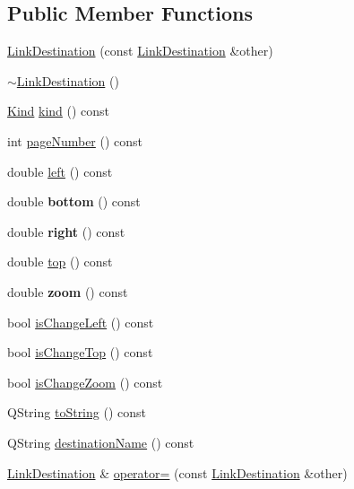 \subsection*{Public Member Functions}
\begin{DoxyCompactItemize}
\item 
\hyperlink{class_poppler_1_1_link_destination_a36d523c302358ce800ad6eb9aa9fe3d0}{Link\+Destination} (const \hyperlink{class_poppler_1_1_link_destination}{Link\+Destination} \&other)
\item 
\hyperlink{class_poppler_1_1_link_destination_ac9b5bcfe42efb41d18f862c8de479af1}{$\sim$\+Link\+Destination} ()
\item 
\hyperlink{class_poppler_1_1_link_destination_a97a2b266fbd0c48fc0189269b9941810}{Kind} \hyperlink{class_poppler_1_1_link_destination_a967d58c1f147720ae0091d0669e6684b}{kind} () const
\item 
int \hyperlink{class_poppler_1_1_link_destination_a618f5280d20902bb83e99e7894ddbafe}{page\+Number} () const
\item 
double \hyperlink{class_poppler_1_1_link_destination_a408de2b77a52aead8f1782ad464c8e3e}{left} () const
\item 
\mbox{\label{class_poppler_1_1_link_destination_a738978c2ece65331e34f4f5f5e474296}} 
double {\bfseries bottom} () const
\item 
\mbox{\label{class_poppler_1_1_link_destination_aef08f29217232da94d47cb9199350d4d}} 
double {\bfseries right} () const
\item 
double \hyperlink{class_poppler_1_1_link_destination_ab890fec31bee5e967c56b443b068f62f}{top} () const
\item 
\mbox{\label{class_poppler_1_1_link_destination_a8bce0c034ee188d2cccf7e255b90df35}} 
double {\bfseries zoom} () const
\item 
bool \hyperlink{class_poppler_1_1_link_destination_a523f8bfa4ae35647d2c00f14ca6bca5f}{is\+Change\+Left} () const
\item 
bool \hyperlink{class_poppler_1_1_link_destination_a477b631b2f1c8bb36813ff49776d331f}{is\+Change\+Top} () const
\item 
bool \hyperlink{class_poppler_1_1_link_destination_ac370c7a2833099390ee4054c02a4b84f}{is\+Change\+Zoom} () const
\item 
Q\+String \hyperlink{class_poppler_1_1_link_destination_a66d3b538d8164c3ea923416fc07a0436}{to\+String} () const
\item 
Q\+String \hyperlink{class_poppler_1_1_link_destination_a6122a9a3dc933c0570a1c2ddab0fbf6a}{destination\+Name} () const
\item 
\hyperlink{class_poppler_1_1_link_destination}{Link\+Destination} \& \hyperlink{class_poppler_1_1_link_destination_a1a1c6b10e0d3e2de275b0cc491a25f92}{operator=} (const \hyperlink{class_poppler_1_1_link_destination}{Link\+Destination} \&other)
\end{DoxyCompactItemize}


